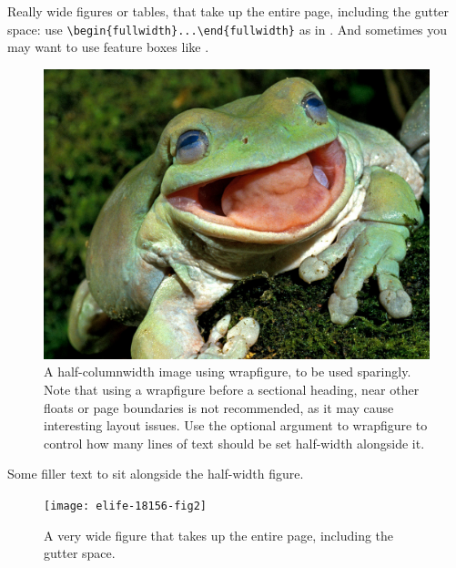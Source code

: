 \documentclass[9pt,lineno]{elife}
\begin{document}
Really wide figures or tables, that take up the entire page, including the gutter space: use \verb|\begin{fullwidth}...\end{fullwidth}| as in . And sometimes you may want to use feature boxes like .

\begin{figure}
\includegraphics[width=\hsize]{frog}
\caption{A half-columnwidth image using wrapfigure, to be used sparingly. Note that using a wrapfigure before a sectional heading, near other floats or page boundaries is not recommended, as it may cause interesting layout issues. Use the optional argument to wrapfigure to control how many lines of text should be set half-width alongside it.}
\label{fig:halfwidth}
\end{figure}

Some filler text to sit alongside the half-width figure. \lipsum[1-2]

\begin{figure}
\begin{fullwidth}
\texttt{[image: elife-18156-fig2]}
\caption{A very wide figure that takes up the entire page, including the gutter space.}
\label{fig:fullwidth}
\end{fullwidth}
\end{figure}
\end{document}
